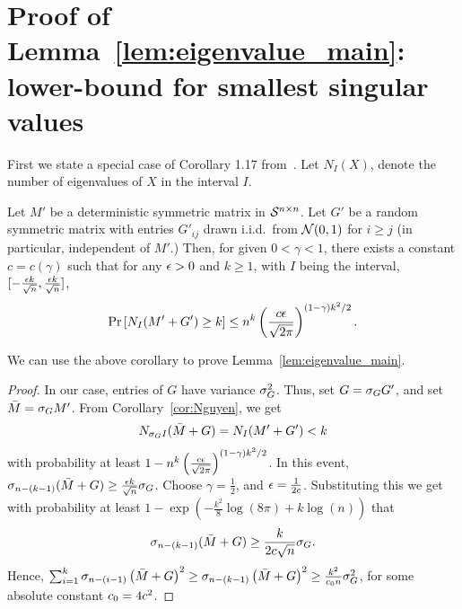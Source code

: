 \section{Proof of Lemma~\ref{lem:eigenvalue_main}: lower-bound for smallest singular values}\label{apdx:proofNguyen}

First we state a special case of Corollary 1.17
from~\citep{nguyen2017repulsion}. Let $N_I(X) $, denote the number of
eigenvalues of $X$ in the interval $I$.
\begin{corollary}\label{cor:Nguyen}
  Let $M'$ be a deterministic symmetric matrix in $\mathcal{S}^{n\times n}$. Let $G'$ be a
  random symmetric matrix with entries $G'_{ij}$ drawn i.i.d.\ from
  $\mathcal{N}(0,1)$ for
  $i \geq j$ (in particular, independent of $M'$.) Then, for given $0 < \gamma < 1$, there exists a
  constant $c = c(\gamma)$ such that for any $\epsilon > 0$ and $k \geq 1$,
  with $I$ being the interval,
  $[-\frac{\epsilon k}{\sqrt{n}}, \frac{\epsilon k}{\sqrt{n}}]$,
$$
\operatorname{Pr}\left[{N_I(M'+G') \geq k }\right] \leq n^k \left(\frac{c\epsilon}{\sqrt{2\pi}}\right)^{(1-\gamma)k^2/2}.
$$
\end{corollary}
We can use the above corollary to prove
Lemma~\ref{lem:eigenvalue_main}.
\begin{proof} %
	In our case, entries of $G$ have variance $\sigma_G^2$. Thus, set $G = \sigma_G G'$, and set $\bar M = \sigma_G M'$.
  From Corollary~\ref{cor:Nguyen}, we get
  \begin{align*}
	  N_{\sigma_G I}(\bar M+G) = N_I(M'+G') < k
  \end{align*}
  with probability
  at least $1 - n^k \left(\frac{c\epsilon}{\sqrt{2\pi}}\right)^{(1-\gamma)k^2/2}$. In this event,
  $\sigma_{n-(k-1)}(\bar M+G) \geq \frac{\epsilon k}{\sqrt{n}} \sigma_G$. Choose
  $\gamma =\frac{1}{2}$, and $\epsilon = \frac{1}{2 c}$. Substituting this we get with
  probability at least
  $1 - \exp\left( - \frac{k^2}{8} \log( 8 \pi) + k \log (n)\right)$
  that
$$
\sigma_{n-(k-1)}(\bar M+G) \geq \frac{k}{2c \sqrt{n}}\sigma_G.
$$
Hence,
$\sum_{i=1}^{k} \sigma_{n-(i-1)}\left(\bar M+G\right)^2 \geq
\sigma_{n-(k-1)}\left(\bar M+G\right)^2 \geq \frac{k^2}{c_0 n}
 \sigma_G^2$, for some absolute constant $c_0 = 4c^2$.
\end{proof}